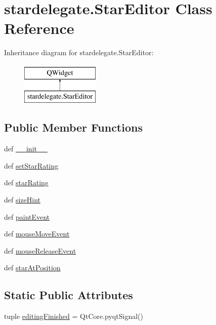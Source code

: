 \hypertarget{classstardelegate_1_1StarEditor}{}\section{stardelegate.\+Star\+Editor Class Reference}
\label{classstardelegate_1_1StarEditor}
Inheritance diagram for stardelegate.\+Star\+Editor\+:\begin{figure}[H]
\begin{center}
\leavevmode
\includegraphics[height=2.000000cm]{classstardelegate_1_1StarEditor}
\end{center}
\end{figure}
\subsection*{Public Member Functions}
\begin{DoxyCompactItemize}
\item 
def \hyperlink{classstardelegate_1_1StarEditor_ac84459d5e42fcca2299ed2a86fa153e1}{\+\_\+\+\_\+init\+\_\+\+\_\+}
\item 
def \hyperlink{classstardelegate_1_1StarEditor_aaf3117a84c509c3a36a0d897ea4628fa}{set\+Star\+Rating}
\item 
def \hyperlink{classstardelegate_1_1StarEditor_a3b29bde37ea898bb8852187ca95b4744}{star\+Rating}
\item 
def \hyperlink{classstardelegate_1_1StarEditor_a9d23e9e7f307807c8e5c0ba902d2f938}{size\+Hint}
\item 
def \hyperlink{classstardelegate_1_1StarEditor_ad55de02f7e4bc55e5f5edee3af46dda6}{paint\+Event}
\item 
def \hyperlink{classstardelegate_1_1StarEditor_a29e78f9605b3e87247d91af7b88f802b}{mouse\+Move\+Event}
\item 
def \hyperlink{classstardelegate_1_1StarEditor_a1aae342e14d6707a9afff787f0969b5d}{mouse\+Release\+Event}
\item 
def \hyperlink{classstardelegate_1_1StarEditor_ad029700a9419cdf8f24159e31e9bde6f}{star\+At\+Position}
\end{DoxyCompactItemize}
\subsection*{Static Public Attributes}
\begin{DoxyCompactItemize}
\item 
tuple \hyperlink{classstardelegate_1_1StarEditor_a0769a1dda5bcfe0ceccded7f2ab66a4d}{editing\+Finished} = Qt\+Core.\+pyqt\+Signal()
\end{DoxyCompactItemize}


